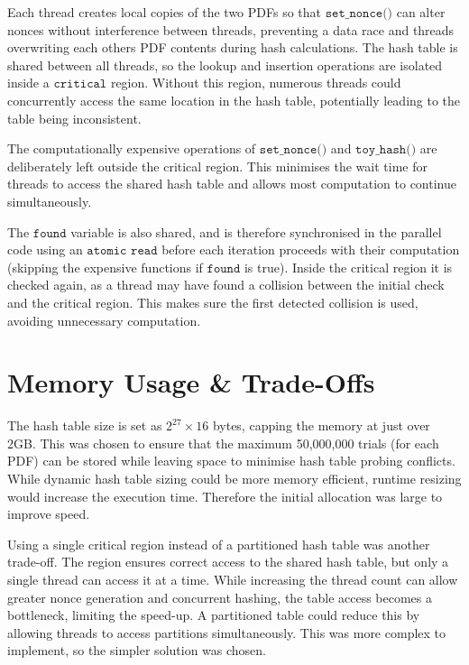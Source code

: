 \documentclass[11pt,a4paper]{article}
\begin{document}
Each thread creates local copies of the two PDFs so that $\texttt{set\_nonce()}$ 
can alter nonces without interference between threads, preventing a data race and threads 
overwriting each others PDF contents during hash calculations. The hash 
table is shared between all threads, so the lookup and insertion operations are 
isolated inside a $\texttt{critical}$ region. Without this region, numerous threads could 
concurrently access the same location in the hash table, potentially leading to the table being 
inconsistent.

The computationally expensive operations of $\texttt{set\_nonce()}$ and $\texttt{toy\_hash()}$ 
are deliberately left outside the critical region. This minimises the wait time for threads to 
access the shared hash table and allows most computation to continue simultaneously.

The $\texttt{found}$ variable is also shared, and is therefore synchronised in the parallel 
code using an $\texttt{atomic read}$ before each iteration proceeds with their computation 
(skipping the expensive functions if $\texttt{found}$ is true). Inside the critical region it 
is checked again, as a thread may have found a collision between the initial check and the 
critical region. This makes sure the first detected collision is used, avoiding unnecessary 
computation.

\section{Memory Usage \& Trade-Offs}

The hash table size is set as $2^{27}\times16$ bytes, capping 
the memory at just over 2GB. This was chosen to ensure that the maximum 
50,000,000 trials (for each PDF) can be stored while leaving space 
to minimise hash table probing conflicts. While dynamic hash table 
sizing could be more memory efficient, runtime resizing would increase the 
execution time. Therefore the initial allocation was large to improve speed.

Using a single critical region instead of a partitioned hash table was another 
trade-off. The region ensures correct access to the shared hash table, but only 
a single thread can access it at a time. While increasing the thread count can 
allow greater nonce generation and concurrent hashing, the table access becomes 
a bottleneck, limiting the speed-up. A partitioned table could reduce this by 
allowing threads to access partitions simultaneously. This was more complex to 
implement, so the simpler solution was chosen.
\end{document}
